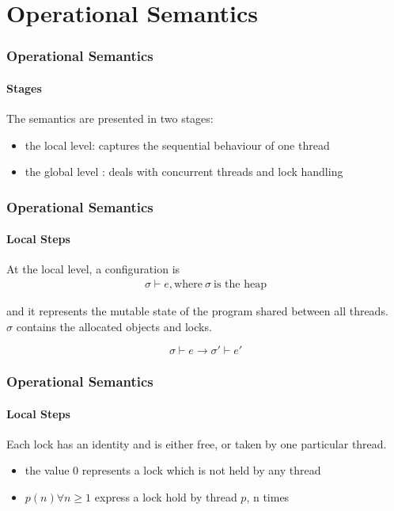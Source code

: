 \section{Operational Semantics}


\begin{frame}
\frametitle{Operational Semantics}
\framesubtitle{Stages}
The semantics are presented in two stages:
\begin{itemize}
    \item the local level: captures the sequential behaviour of one thread
    \item the global level : deals with concurrent threads and lock handling
\end{itemize}


\end{frame}

\begin{frame}
\frametitle{Operational Semantics}
\framesubtitle{Local Steps}

At the local level, a configuration is 
\begin{align*}
    \tag{Local Configuration}
    \sigma \vdash e,
    \text{where} ~\sigma~ \text{is the heap}
\end{align*}

and it represents the mutable state of the program shared between all threads.
\newline \\
$\sigma$ contains the allocated objects and locks.

\begin{equation}
    \tag{Local Reduction Step}
    \sigma \vdash e \longrightarrow \sigma' \vdash e'
\end{equation}
\end{frame}

\begin{frame}
\frametitle{Operational Semantics}
\framesubtitle{Local Steps}
Each lock has an identity and is either free, or taken by one particular thread. 

\begin{itemize}
    \item the value 0 represents a lock which is not held by any thread
    \item $p(n) \forall n \ge 1$ express a lock hold by thread $p$, n times 
\end{itemize}
\end{frame}


